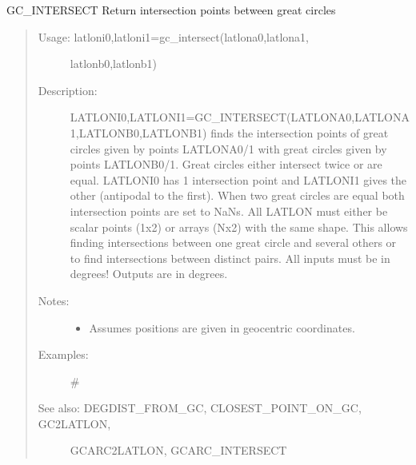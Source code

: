 \documentclass[letterpaper,10pt,english]{sphinxmanual}
\begin{document}
\begin{fulllineitems}
\label{\detokenize{infrapy.utils:infrapy.utils.latlon.gc_intersect}}
GC\_INTERSECT    Return intersection points between great circles
\begin{quote}
\begin{description}
\item[{Usage:    latloni0,latloni1=gc\_intersect(latlona0,latlona1,}] \leavevmode
latlonb0,latlonb1)

\item[{Description:}] \leavevmode
LATLONI0,LATLONI1=GC\_INTERSECT(LATLONA0,LATLONA1,LATLONB0,LATLONB1)
finds the intersection points of great circles given by points
LATLONA0/1 with great circles given by points LATLONB0/1.  Great
circles either intersect twice or are equal.  LATLONI0 has 1
intersection point and LATLONI1 gives the other (antipodal to the
first).  When two great circles are equal both intersection points are
set to NaNs. All LATLON must either be scalar points (1x2) or arrays
(Nx2) with the same shape.  This allows finding intersections between
one great circle and several others or to find intersections between
distinct pairs.  All inputs must be in degrees! Outputs are in degrees.

\item[{Notes:}] \leavevmode\begin{itemize}
\item {} 
Assumes positions are given in geocentric coordinates.

\end{itemize}

\item[{Examples:}] \leavevmode
\#

\item[{See also: DEGDIST\_FROM\_GC, CLOSEST\_POINT\_ON\_GC, GC2LATLON,}] \leavevmode
GCARC2LATLON, GCARC\_INTERSECT

\end{description}
\end{quote}

\end{fulllineitems}

\end{document}
